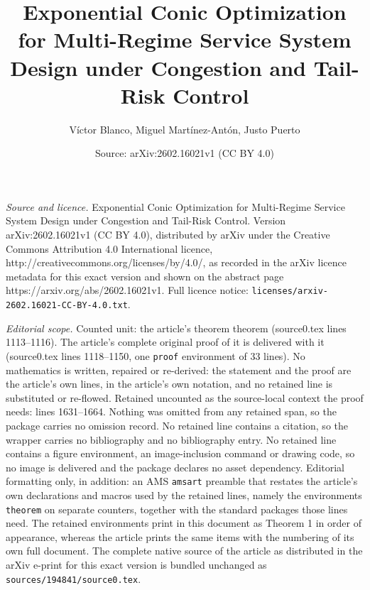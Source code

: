 \documentclass[10pt,a4paper]{amsart}
\title{\huge Exponential Conic Optimization for Multi-Regime Service System Design under Congestion and Tail-Risk Control}
\author{V\'ictor Blanco, Miguel Mart\'inez-Ant\'on, Justo Puerto}
\date{Source: arXiv:2602.16021v1 (CC BY 4.0)}
\begin{document}
\maketitle

\noindent\emph{Source and licence.} \huge Exponential Conic Optimization for Multi-Regime Service System Design under Congestion and Tail-Risk Control. Version arXiv:2602.16021v1 (CC BY 4.0), distributed by arXiv under the Creative Commons Attribution 4.0 International licence, http://creativecommons.org/licenses/by/4.0/, as recorded in the arXiv licence metadata for this exact version and shown on the abstract page https://arxiv.org/abs/2602.16021v1. Full licence notice: \texttt{licenses/arxiv-2602.16021-CC-BY-4.0.txt}.\par\smallskip

\noindent\textit{Editorial scope.} Counted unit: the article's theorem theorem (source0.tex lines 1113--1116). The article's complete original proof of it is delivered with it (source0.tex lines 1118--1150, one \texttt{proof} environment of 33 lines). No mathematics is written, repaired or re-derived: the statement and the proof are the article's own lines, in the article's own notation, and no retained line is substituted or re-flowed.  Retained uncounted as the source-local context the proof needs: lines 1631--1664.  Nothing was omitted from any retained span, so the package carries no omission record.  No retained line contains a citation, so the wrapper carries no bibliography and no bibliography entry.  No retained line contains a figure environment, an image-inclusion command or drawing code, so no image is delivered and the package declares no asset dependency.  Editorial formatting only, in addition: an AMS \texttt{amsart} preamble that restates the article's own declarations and macros used by the retained lines, namely the environments \texttt{theorem} on separate counters, together with the standard packages those lines need.  The retained environments print in this document as Theorem 1 in order of appearance, whereas the article prints the same items with the numbering of its own full document.  The complete native source of the article as distributed in the arXiv e-print for this exact version is bundled unchanged as \texttt{sources/194841/source0.tex}.
\end{document}
